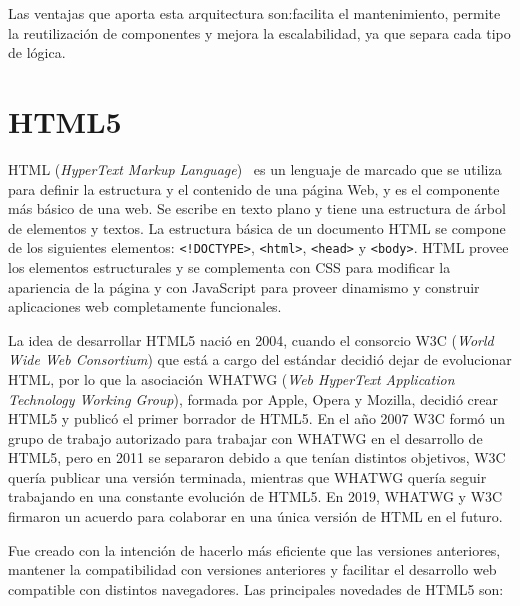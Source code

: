 \documentclass[a4paper, 12pt]{book}
\begin{document}
Las ventajas que aporta esta arquitectura son:facilita el mantenimiento, permite la reutilización de componentes y mejora la escalabilidad, ya que separa cada tipo de lógica.

\section{HTML5} 
\label{sec:HTML5}

HTML (\emph{HyperText Markup Language})~\cite{Pagina_HTML, Historia_HTML5, gauchat2012gran} es un lenguaje de marcado que se utiliza para definir la estructura y el contenido de una página Web, y es el componente más básico de una web. 
Se escribe en texto plano y tiene una estructura de árbol de elementos y textos. 
La estructura básica de un documento HTML se compone de los siguientes elementos: \texttt{<!DOCTYPE>}, \texttt{<html>}, \texttt{<head>} y \texttt{<body>}. 
HTML provee los elementos estructurales y se complementa con CSS para modificar la apariencia de la página y con JavaScript para proveer dinamismo y construir aplicaciones web completamente funcionales. 

La idea de desarrollar HTML5 nació en 2004, cuando el consorcio W3C (\emph{World Wide Web Consortium})  que está a cargo del estándar decidió dejar de evolucionar HTML, por lo que la asociación WHATWG (\emph{Web HyperText Application Technology Working Group}), formada por Apple, Opera y Mozilla, decidió crear HTML5 y publicó el primer borrador de HTML5. 
En el año 2007 W3C formó un grupo de trabajo autorizado para trabajar con WHATWG en el desarrollo de HTML5, pero en 2011 se separaron debido a que tenían distintos objetivos, W3C quería publicar una versión terminada, mientras que WHATWG quería seguir trabajando en una constante evolución de HTML5. 
En 2019, WHATWG y W3C firmaron un acuerdo para colaborar en una única versión de HTML en el futuro.

Fue creado con la intención de hacerlo más eficiente que las versiones anteriores, mantener la compatibilidad con versiones anteriores y facilitar el desarrollo web compatible con distintos navegadores. Las principales novedades de HTML5 son:
\end{document}
